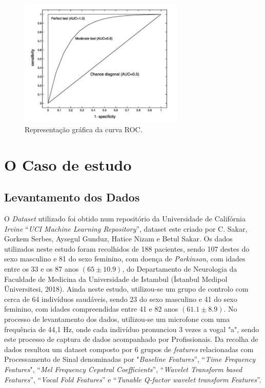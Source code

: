 \documentclass[12pt,a4paper,twoside]{report}
\begin{document}
{\begin{figure}[H]
    \centering
    \includegraphics[width=0.7\textwidth]{imagens/roc.png}
    \caption{Representação gráfica da curva \gls{ROC}.}
    \label{fig:roc}
\end{figure}

\chapter{O Caso de estudo}
\section{Levantamento dos Dados}

O \textit{Dataset} utilizado foi obtido num repositório da Universidade de Califórnia \textit{Irvine} “\textit{UCI Machine Learning Repository}”, dataset este criado por C. Sakar, Gorkem Serbes, Aysegul Gunduz, Hatice Nizam e Betul Sakar.
Os dados utilizados neste estudo foram recolhidos de 188 pacientes, sendo 107 destes do sexo masculino e 81 do sexo feminino, com doença de \textit{Parkinson}, com idades entre os 33 e os 87 anos $(65 \pm 10.9)$, do Departamento de Neurologia da Faculdade de Medicina da Universidade de Istambul (İstanbul Medipol Üniversitesi, 2018). Ainda neste estudo, utilizou-se um grupo de controlo com cerca de 64 indivíduos saudáveis, sendo 23 do sexo masculino e 41 do sexo feminino, com idades compreendidas entre 41 e 82 anos $(61.1 \pm 8.9)$. No processo de levantamento dos dados, utilizou-se um microfone com uma frequência de 44,1 Hz, onde cada indivíduo pronunciou 3 vezes a vogal "a", sendo este processo de captura de dados acompanhado por Profissionais. Da recolha de dados resultou um dataset composto por 6 grupos de \textit{features} relacionadas com Processamento de Sinal denominadas por "\textit{Baseline Features}”, “\textit{Time Frequency Features}",
“\textit{Mel Frequency Cepstral Coefficients}”, “\textit{Wavelet Transform based Features}”, “\textit{Vocal Fold Features}” e
“\textit{Tunable Q-factor wavelet transform Features}”.

}
\end{document}
